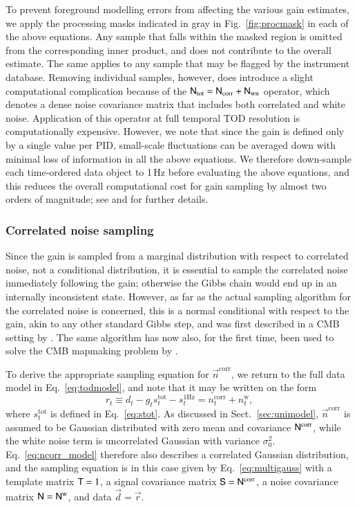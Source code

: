 \documentclass[twocolumn]{aa}
\renewcommand{\d}[0]{\vec{d}}
\newcommand{\n}[0]{\vec{n}}
\newcommand{\T}[0]{\tens{T}}
\newcommand{\N}[0]{\tens{N}}
\renewcommand{\S}[0]{\tens{S}}
\renewcommand{\r}[0]{\vec{r}}
\begin{document}
To prevent foreground modelling errors from affecting the various gain
estimates, we apply the processing masks indicated in gray in
Fig.~\ref{fig:procmask} in each of the above equations. Any sample
that falls within the masked region is omitted from the corresponding
inner product, and does not contribute to the overall estimate. The
same applies to any sample that may be flagged by the instrument
database. Removing individual samples, however, does introduce a
slight computational complication because of the
$\N_{\mathrm{tot}}=\N_{\mathrm{corr}}+\N_{\mathrm{wn}}$ operator,
which denotes a dense noise covariance matrix that includes both
correlated and white noise. Application of this operator at full
temporal TOD resolution is computationally expensive. However, we note
that since the gain is defined only by a single value per PID,
small-scale fluctuations can be averaged down with minimal loss of
information in all the above equations. We therefore down-sample each
time-ordered data object to 1\,Hz before evaluating the above
equations, and this reduces the overall computational cost for gain
sampling by almost two orders of magnitude; see \citet{bp07} and \citet{bp06} for
further details.

\subsubsection{Correlated noise sampling}
\label{sec:ncorr}

Since the gain is sampled from a marginal distribution with respect to
correlated noise, not a conditional distribution, it is essential to
sample the correlated noise immediately following the gain; otherwise
the Gibbs chain would end up in an internally inconsistent
state. However, as far as the actual sampling algorithm for the
correlated noise is concerned, this is a normal conditional with
respect to the gain, akin to any other standard Gibbs step, and was
first described in a CMB setting by \citet{wehus:2012}. The same
algorithm has now also, for the first time, been used to solve the CMB
mapmaking problem by \citet{bp02}.

To derive the appropriate sampling equation for $\n^{\mathrm{corr}}$,
we return to the full data model in Eq.~\eqref{eq:todmodel}, and note
that it may be written on the form
\begin{equation}
  r_{t} \equiv d_{t} - g_{t} s^{\mathrm{tot}}_{t} - s^{\mathrm{1Hz}}_t =
  n^{\mathrm{corr}}_{t} + n^{\mathrm{w}}_{t},
  \label{eq:ncorr_model}
\end{equation}
where $s^{\mathrm{tot}}_{t}$ is defined in Eq.~\eqref{eq:stot}. As
discussed in Sect.~\ref{sec:unimodel}, $\n^{\mathrm{corr}}$ is assumed
to be Gaussian distributed with zero mean and covariance
$\N^{\mathrm{corr}}$, while the white noise term is uncorrelated
Gaussian with variance $\sigma_0^2$. Eq.~\eqref{eq:ncorr_model}
therefore also describes a correlated Gaussian distribution, and the
sampling equation is in this case given by Eq.~\eqref{eq:multigauss}
with a template matrix $\T=1$, a signal covariance matrix $\S =
\N^{\mathrm{corr}}$, a noise covariance matrix $\N = \N^{\mathrm{w}}$,
and data $\d=\r$.
\end{document}
